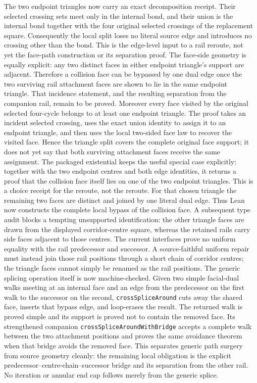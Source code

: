 \documentclass[11pt]{article}
\theoremstyle{definition}
\begin{document}
The two endpoint triangles now carry an exact decomposition receipt.  Their
selected crossing sets meet only in the internal bond, and their union is the
internal bond together with the four original selected crossings of the
replacement square.  Consequently the local split loses no literal source
edge and introduces no crossing other than the bond.  This is the edge-level
input to a rail reroute, not yet the face-path construction or its separation
proof.
The face-side geometry is equally explicit: any two distinct faces in either
endpoint triangle's support are adjacent.  Therefore a collision face can be
bypassed by one dual edge once the two surviving rail attachment faces are
shown to lie in the same endpoint triangle.  That incidence statement, and
the resulting separation from the companion rail, remain to be proved.
Moreover every face visited by the original selected four-cycle belongs to at
least one endpoint triangle.  The proof takes an incident selected crossing,
uses the exact union identity to assign it to an endpoint triangle, and then
uses the local two-sided face law to recover the visited face.  Hence the
triangle split covers the complete original face support; it does not yet say
that both surviving attachment faces receive the same assignment.
The packaged existential keeps the useful special case explicitly: together
with the two endpoint centres and both edge identities, it returns a proof
that the collision face itself lies on one of the two endpoint triangles.
This is a choice receipt for the reroute, not the reroute.
For that chosen triangle the remaining two faces are distinct and joined by
one literal dual edge.  Thus Lean now constructs the complete local bypass of
the collision face.  A subsequent type audit blocks a tempting unsupported
identification: the other triangle faces are drawn from the displayed
corridor-centre square, whereas the retained rails carry side faces adjacent
to those centres.  The current interfaces prove no uniform equality with the
rail predecessor and successor.  A source-faithful uniform repair must instead
join those rail positions through a short chain of corridor centres; the
triangle faces cannot simply be renamed as the rail positions.
The generic splicing operation itself is now machine-checked.  Given two
simple facial-dual walks meeting at an internal face and an edge from the
predecessor on the first walk to the successor on the second,
\texttt{crossSpliceAround} cuts away the shared face, inserts that bypass edge,
and loop-erases the result.  The returned walk is proved simple and its support
is proved not to contain the removed face.  Its strengthened companion
\texttt{crossSpliceAroundWithBridge} accepts a complete walk between the two
attachment positions and proves the same avoidance theorem when that bridge
avoids the removed face.  This separates generic path surgery from source
geometry cleanly: the remaining local obligation is the explicit
predecessor--centre-chain--successor bridge and its separation from the other
rail.  No iteration or annular end cap follows merely from the generic splice.
\end{document}
